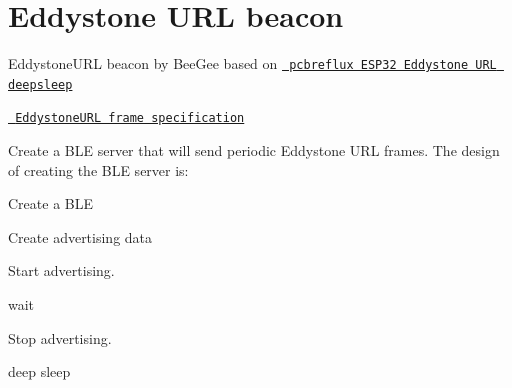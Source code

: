 \chapter{Eddystone URL beacon}
\hypertarget{md__c_1_2_users_2hatta_2_desktop_2presonal-projects_2security-camera_2esp-idf-vs-ext_2_e_s_p-32-fb19c0cd4e42c6846313f261c5182e0d}{}\label{md__c_1_2_users_2hatta_2_desktop_2presonal-projects_2security-camera_2esp-idf-vs-ext_2_e_s_p-32-fb19c0cd4e42c6846313f261c5182e0d}
\label{md__c_1_2_users_2hatta_2_desktop_2presonal-projects_2security-camera_2esp-idf-vs-ext_2_e_s_p-32-fb19c0cd4e42c6846313f261c5182e0d_autotoc_md18}%
%


Eddystone\+URL beacon by Bee\+Gee based on \href{https://github.com/pcbreflux/espressif/tree/master/esp32/arduino/sketchbook/ESP32_Eddystone_URL_deepsleep}{\texttt{ pcbreflux ESP32 Eddystone URL deepsleep}}

\href{https://github.com/google/eddystone/blob/master/eddystone-url/README.md}{\texttt{ Eddystone\+URL frame specification}}

Create a BLE server that will send periodic Eddystone URL frames. The design of creating the BLE server is\+:
\begin{DoxyEnumerate}
\item Create a BLE 
\item Create advertising data
\item Start advertising.
\item wait
\item Stop advertising.
\item deep sleep 
\end{DoxyEnumerate}